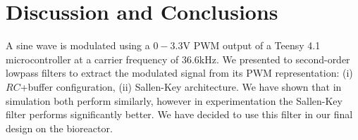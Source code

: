 \vspace{-1em}
\section{Discussion and Conclusions}
\vspace{-1em}

A sine wave is modulated using a $0-3.3$\unit{\volt} PWM output of a Teensy 4.1
microcontroller at a carrier frequency of $36.6$\unit{\kilo\hertz}. We presented
to second-order lowpass filters to extract the modulated signal from its PWM
representation: (i) $RC$+buffer configuration, (ii) Sallen-Key architecture. We
have shown that in simulation both perform similarly, however in experimentation
the Sallen-Key filter performs significantly better. We have decided to use this
filter in our final design on the bioreactor.

